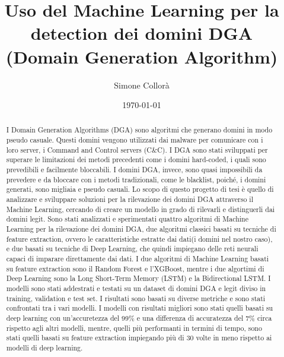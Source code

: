 \documentclass[12pt,a4paper,openright,twoside]{book}
\title{Uso del Machine Learning per la detection dei domini DGA \break (Domain Generation Algorithm)}
\author{Simone Collorà}
\date{\today}
\begin{document}
\frontmatter\frontispiece
\nocite{*}

\begin{abstract}	
I Domain Generation Algorithms (DGA) sono algoritmi che generano domini in modo pseudo casuale.
Questi domini vengono utilizzati dai malware per comunicare con i loro server,
i Command and Control servers (C\&C).
I DGA sono stati sviluppati per superare le limitazioni
dei metodi precedenti come i domini hard-coded, i quali
sono prevedibili e facilmente bloccabili.
I domini DGA, invece, sono quasi impossibili da prevedere e da bloccare con i metodi tradizionali,
come le blacklist,
poiché, i domini generati, sono migliaia e pseudo casuali.
Lo scopo di questo progetto di tesi è quello di analizzare
e sviluppare soluzioni per la rilevazione dei domini DGA attraverso il Machine Learning, cercando
di creare un modello in grado di rilevarli e distinguerli
dai domini legit.
Sono stati analizzati e sperimentati quattro algoritmi di Machine Learning
per la rilevazione dei domini DGA, due algoritmi classici 
basati su tecniche di feature extraction, ovvero le caratteristiche estratte dai dati(i domini nel nostro caso),
e due basati su tecniche di Deep Learning, che quindi impiegano delle
reti neurali capaci di imparare direttamente dai dati.
I due algoritmi di Machine Learning basati su feature extraction
sono il Random Forest e l'XGBoost, mentre i due algortimi
di Deep Learning sono la Long Short-Term Memory (LSTM) e la Bidirectional LSTM.
I modelli sono stati addestrati e testati su un dataset di domini
DGA e legit diviso in training, validation e test set.
I risultati sono basati su diverse metriche e
sono stati confrontati tra i vari modelli.
I modelli con risultati migliori sono stati
quelli basati su deep learning con un'accuretezza del 99\% e una differenza di accuratezza del 7\%
circa rispetto agli altri modelli,
mentre, quelli più performanti in termini di tempo,
sono stati quelli basati su feature extraction
impiegando più di 30 volte in meno rispetto ai modelli di deep learning.
\end{abstract}



\tableofcontents   
\listoffigures     %

\mainmatter
\end{document}
